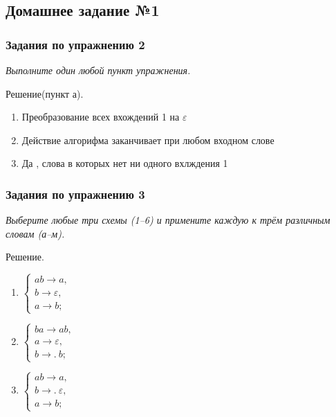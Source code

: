 \documentclass[12pt,a4paper]{article}
\renewcommand{\to}{\longrightarrow}
\newcommand{\tof}{\to\!\!.\ }
\begin{document}
\begin{center}
\section*{Домашнее задание №1}
\end{center}


\subsubsection*{Задания по упражнению 2}

\emph{Выполните один любой пункт упражнения.}

Решение(пункт а).
\begin{enumerate}
	\item Преобразование всех вхождений 1 на $ \varepsilon$ 
	\item Действие алгорифма заканчивает при любом входном слове
	\item Да , слова в которых нет ни одного вхлждения 1
\end{enumerate}

\subsubsection*{Задания по упражнению 3}

\emph{Выберите любые три схемы (1--6) и примените каждую к трём различным словам (а--м).}

Решение.
\begin{multicols}{3}
\begin{enumerate}
\item  $\begin{cases}
ab\to a,\\
b\to\varepsilon,\\
a\to b;
\end{cases}$%
\item $\begin{cases}
ba\to ab,\\
a\to\varepsilon,\\
b\tof b;
\end{cases}$
\item  $\begin{cases}
ab\to a,\\
b\tof\varepsilon,\\
a\to b;
\end{cases}$
\end{enumerate}
\end{multicols}
\end{document}
